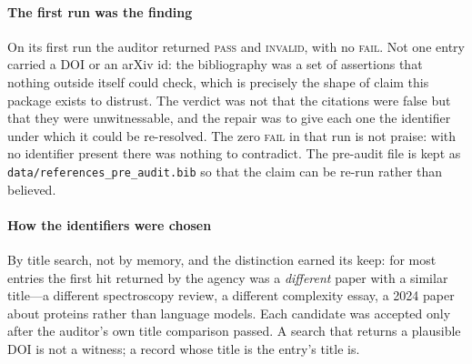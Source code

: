 \documentclass[conference]{IEEEtran}
\theoremstyle{definition}
\begin{document}
\paragraph{The first run was the finding} On its first run the auditor returned
\caPriorPass{} \textsc{pass} and \caPriorInvalid{} \textsc{invalid}, with no
\textsc{fail}. Not one entry carried a DOI or an arXiv id: the bibliography was a
set of assertions that nothing outside itself could check, which is precisely the
shape of claim this package exists to distrust. The verdict was not that the
citations were false but that they were unwitnessable, and the repair was to give
each one the identifier under which it could be re-resolved. The zero \textsc{fail}
in that run is not praise: with no identifier present there was nothing to
contradict. The pre-audit file is kept as
\texttt{data/references\_pre\_audit.bib} so that the claim can be re-run rather
than believed.

\paragraph{How the identifiers were chosen} By title search, not by memory, and
the distinction earned its keep: for most entries the first hit returned by the
agency was a \emph{different} paper with a similar title---a different spectroscopy
review, a different complexity essay, a 2024 paper about proteins rather than
language models. Each candidate was accepted only after the auditor's own title
comparison passed. A search that returns a plausible DOI is not a witness; a record
whose title is the entry's title is.

\begin{table}[h!]
\centering
\caption{Bibliography audit. The verdict column is the auditor's own; the last
column distinguishes an entry an agency witnessed from one a human located. A
\textsc{pass} means the identifier resolved and the returned title matched, not
that the paper is correct.}
\label{tab:bibaudit}
\footnotesize

\end{table}



\end{document}
